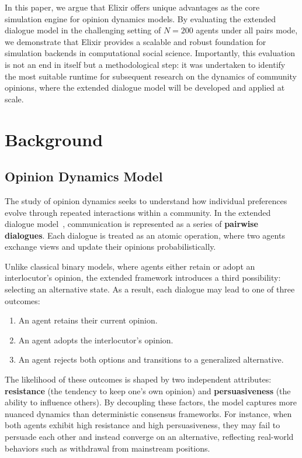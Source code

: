 \documentclass[
]{ceurart}
\begin{document}
In this paper, we argue that Elixir offers unique advantages as the core simulation engine for opinion dynamics models. By evaluating the extended dialogue model in the challenging setting of $N = 200$ agents under all pairs mode, we demonstrate that Elixir provides a scalable and robust foundation for simulation backends in computational social science. Importantly, this evaluation is not an end in itself but a methodological step: it was undertaken to identify the most suitable runtime for subsequent research on the dynamics of community opinions, where the extended dialogue model will be developed and applied at scale.

\section{Background}\label{sec:background}
\subsection{Opinion Dynamics Model}
The study of opinion dynamics seeks to understand how individual preferences evolve through repeated interactions within a community. In the extended dialogue model~\cite{Lytvynenko2025}, communication is represented as a series of \textbf{pairwise dialogues}. Each dialogue is treated as an atomic operation, where two agents exchange views and update their opinions probabilistically.

Unlike classical binary models, where agents either retain or adopt an interlocutor’s opinion, the extended framework introduces a third possibility: selecting an alternative state. As a result, each dialogue may lead to one of three outcomes:
\begin{enumerate}
	\item An agent retains their current opinion.
	\item An agent adopts the interlocutor’s opinion.
	\item An agent rejects both options and transitions to a generalized alternative.
\end{enumerate}
The likelihood of these outcomes is shaped by two independent attributes: \textbf{resistance} (the tendency to keep one’s own opinion) and \textbf{persuasiveness} (the ability to influence others). By decoupling these factors, the model captures more nuanced dynamics than deterministic consensus frameworks. For instance, when both agents exhibit high resistance and high persuasiveness, they may fail to persuade each other and instead converge on an alternative, reflecting real-world behaviors such as withdrawal from mainstream positions.
\end{document}
